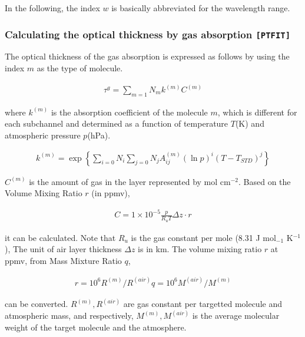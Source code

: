 In the following, the index \(w\) is basically abbreviated for the
wavelength range.

\hypertarget{calculating-the-optical-thickness-by-gas-absorption-moduleptfit}{%
\subsubsection{\texorpdfstring{Calculating the optical thickness by gas
absorption
\texttt{{[}PTFIT{]}}}{Calculating the optical thickness by gas absorption {[}PTFIT{]}}}
\label{calculating-the-optical-thickness-by-gas-absorption-moduleptfit}}

The optical thickness of the gas absorption is expressed as follows
by using the index \(m\) as the type of molecule.

\begin{eqnarray}
  \tau^g = \sum_{m=1}{N_m} k^{(m)} C^{(m)}
\end{eqnarray}

where \(k^{(m)}\) is the absorption coefficient of the molecule \(m\),
which is different for each subchannel and determined as a function of 
temperature \(T\)(K) and atmospheric pressure \(p\)(hPa).

\begin{eqnarray}
 k^{(m)} = \exp\left\{ \sum_{i=0}{N_i} \sum_{j=0}{N_j} A^{(m)}_{ij}
                   (\ln p)^{i} (T-T_{STD})^{j}
               \right\}
\end{eqnarray}

\(C^{(m)}\) is the amount of gas in the layer represented by
mol cm\(^{-2}\). Based on the Volume Mixing Ratio \(r\) (in ppmv),

\begin{eqnarray}
  C = 1\times 10^{-5} \frac{p}{R_u T} \Delta z \cdot r
\end{eqnarray}

it can be calculated. Note that \(R_u\) is the gas constant
per mole (8.31 J mol\(_{-1}\) K\(^{-1}\)), The unit of air layer
thickness \(\Delta z\) is in km. The volume mixing ratio \(r\) at ppmv, 
from Mass Mixture Ratio \(q\),

\begin{eqnarray}
  r = 10^6 R^{(m)}/R^{(air)} q = 10^6 M^{(air)}/M^{(m)}
\end{eqnarray}

can be converted. \(R^{(m)},R^{(air)}\) are gas constant per
targetted molecule and atmospheric mass, and respectively,
\(M^{(m)},M^{(air)}\) is the average molecular weight of the
target molecule and the atmosphere.

